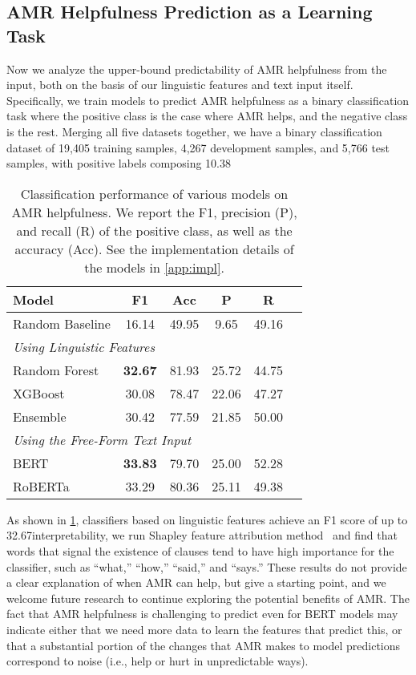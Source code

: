 \subsection{AMR Helpfulness Prediction as a Learning Task
}\label{sec:classify}
Now we analyze the upper-bound predictability of AMR helpfulness from the input, both on the basis of our linguistic features and text input itself.
Specifically, we train models to predict AMR helpfulness as a binary classification task where the positive class is the case where AMR helps, and the negative class is the rest.
Merging all five datasets together, we have a binary classification dataset of 19,405 training samples, 4,267 development samples, and 5,766 test samples, with positive labels composing 10.38\
\begin{table}[b]
\centering \small
\begin{tabular}{lccccc}
\toprule
Model & F1 & Acc & P & R\\\midrule
Random Baseline & 16.14 & 49.95 & 9.65 & 49.16 \\ \hline \multicolumn{5}{l}{\textit{Using Linguistic Features}}\\
Random Forest& \textbf{32.67} & 81.93 & 25.72 & 44.75\\
XGBoost& 30.08 & 78.47 & 22.06 & 47.27\\ 
Ensemble& 30.42 & 77.59 & 21.85 & 50.00\\ \hline
\multicolumn{5}{l}{\textit{Using the Free-Form Text Input}}\\
{BERT} & 
\textbf{33.83}
& 79.70
& 25.00
& 52.28

\\
{RoBERTa} & 33.29
& 80.36
& 25.11
& 49.38 \\
\bottomrule
\end{tabular}
\caption{Classification performance of various models on AMR helpfulness. We report the F1, precision (P), and recall (R) of the positive class, as well as the accuracy (Acc). See the implementation details of the models in \cref{app:impl}.
}
\label{tab:amr_helpfulness_prediction}
\end{table}

As shown in \cref{tab:amr_helpfulness_prediction}, classifiers based on linguistic features achieve an F1 score of up to {32.67}\For interpretability, we run Shapley feature attribution method~\citep{Fryer2021Shapley} and find that words that signal the existence of clauses tend to have high importance for the classifier, such as ``what,'' ``how,'' ``said,'' and ``says.'' These results do not provide a clear explanation of when AMR can help, but give a starting point, and we welcome future research to continue exploring the potential benefits of AMR. The fact that AMR helpfulness is challenging to predict even for BERT models may indicate either that we need more data to learn the features that predict this, or that a substantial portion of the changes that AMR makes to model predictions correspond to noise (i.e., help or hurt in unpredictable ways).


